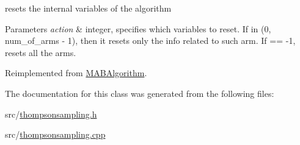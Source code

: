 resets the internal variables of the algorithm 


\begin{DoxyParams}{Parameters}
{\em action} & integer, specifies which variables to reset. If in (0, num\+\_\+of\+\_\+arms -\/ 1), then it resets only the info related to such arm. If == -\/1, resets all the arms. \\
\hline
\end{DoxyParams}


Reimplemented from \mbox{\hyperlink{class_m_a_b_algorithm_ad5761cee0b0e3421d1f043dbcc0b5f85}{M\+A\+B\+Algorithm}}.



The documentation for this class was generated from the following files\+:\begin{DoxyCompactItemize}
\item 
src/\mbox{\hyperlink{thompsonsampling_8h}{thompsonsampling.\+h}}\item 
src/\mbox{\hyperlink{thompsonsampling_8cpp}{thompsonsampling.\+cpp}}\end{DoxyCompactItemize}
